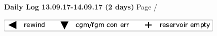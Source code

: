 \noindent \large{\textbf{Daily Log 13.09.17-14.09.17 (2 days)}} \hfill \small{Page \thepage/\pageref{LastPage}}

\vspace{0.5em}
\centerline{\includegraphics{legendSymbols.pdf}}
\vspace{0.1em}